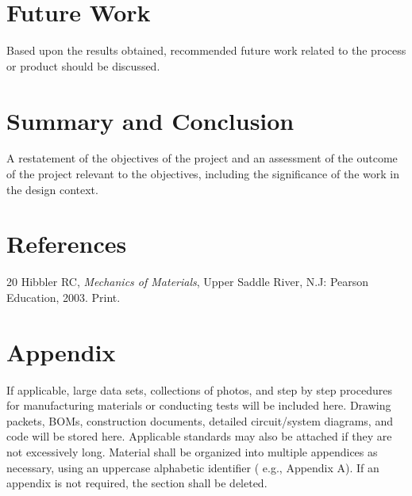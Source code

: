 \documentclass[fleqn,10pt]{project}
\begin{document}
\section{Future Work}

Based upon the results obtained, recommended future work related to the process or product 
should be discussed. 

\section{Summary and Conclusion}

A restatement of the objectives of the project and an assessment of the outcome of the project 
relevant to the objectives, including the significance of the work in the design context. 

\section{References}



\let\seccs=\section
\renewcommand{\section}[2]{}%

\begin{thebibliography}{20}
%
 Hibbler RC, {\it Mechanics of Materials}, Upper Saddle River, N.J: Pearson Education, 2003. Print.
%
\end{thebibliography}

%

\let\section=\seccs

\section{Appendix}
If applicable, large data sets, collections of photos, and step by step procedures for 
manufacturing materials or conducting tests will be included here. Drawing packets, BOMs,
construction documents, detailed circuit/system diagrams, and code will be stored here. 
Applicable standards may also be attached if they are not excessively long.
Material shall be 
organized into multiple appendices as necessary, using an uppercase alphabetic identifier (
e.g., Appendix A). If an appendix is not required, the section shall be deleted. 
\end{document}
